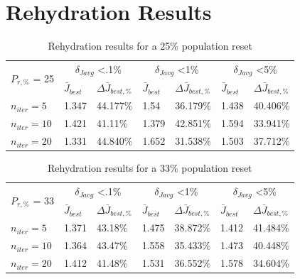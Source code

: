 \section{Rehydration Results}

\begin{table}[H]
  \centering
  \begin{tabular}{lll|ll|ll}
    \toprule
    \multirow{2}{*}{$P_{r,\text{\%}}$ = 25} &
      \multicolumn{2}{c}{$\delta_{Javg}$ \textless .1\%} &
      \multicolumn{2}{c}{$\delta_{Javg}$ \textless 1\%} &
      \multicolumn{2}{c}{$\delta_{Javg}$ \textless 5\%} \\
      \cmidrule{2-7}
    & $\bar{J}_{best}$ & $\Delta \bar{J}_{best,\text{\%}}$ & $\bar{J}_{best}$ & $\Delta \bar{J}_{best,\text{\%}}$ & $\bar{J}_{best}$ & $\Delta \bar{J}_{best,\text{\%}}$ \\
    \midrule

    $n_{iter}=5$ & 1.347 & 44.177\% & 1.54 & 36.179\% & 1.438 & 40.406\% \\
    $n_{iter}=10$ & 1.421 & 41.11\% & 1.379 & 42.851\% & 1.594 & 33.941\% \\
    $n_{iter}=20$ & 1.331 & 44.840\% & 1.652 & 31.538\% & 1.503 & 37.712\% \\
    \bottomrule
  \end{tabular}
  \caption{Rehydration results for a 25\% population reset}
  \label{tab:rehydation-p25}
\end{table}

\begin{table}[H]
  \centering
  \begin{tabular}{lll|ll|ll}
    \toprule
    \multirow{2}{*}{$P_{r,\text{\%}}$ = 33} &
      \multicolumn{2}{c}{$\delta_{Javg}$ \textless .1\%} &
      \multicolumn{2}{c}{$\delta_{Javg}$ \textless 1\%} &
      \multicolumn{2}{c}{$\delta_{Javg}$ \textless 5\%} \\
      \cmidrule{2-7}
    & $\bar{J}_{best}$ & $\Delta \bar{J}_{best,\text{\%}}$ & $\bar{J}_{best}$ & $\Delta \bar{J}_{best,\text{\%}}$ & $\bar{J}_{best}$ & $\Delta \bar{J}_{best,\text{\%}}$ \\
    \midrule

    $n_{iter}=5$ & 1.371 & 43.18\% & 1.475 & 38.872\% & 1.412 & 41.484\% \\
    $n_{iter}=10$ & 1.364 & 43.47\% & 1.558 & 35.433\% & 1.473 & 40.448\% \\
    $n_{iter}=20$ & 1.412 & 41.48\% & 1.531 & 36.552\% & 1.578 & 34.604\% \\
    \bottomrule
  \end{tabular}
  \caption{Rehydration results for a 33\% population reset}
  \label{tab:rehydation-p33}
\end{table}


